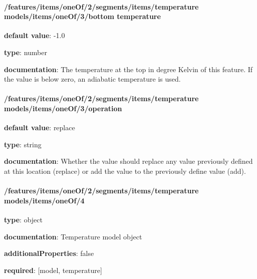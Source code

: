 \begin{itemized}
\end{itemized}\paragraph{/features/items/oneOf/2/segments/items/temperature models/items/oneOf/3/bottom temperature} \begin{itemized}
\item {\bf default value}: -1.0
\item {\bf type}: number
\item {\bf documentation}: The temperature at the top in degree Kelvin of this feature. If the value is below zero, an adiabatic temperature is used.
\end{itemized}\paragraph{/features/items/oneOf/2/segments/items/temperature models/items/oneOf/3/operation} \begin{itemized}
\item {\bf default value}: replace
\item {\bf type}: string
\item {\bf documentation}: Whether the value should replace any value previously defined at this location (replace) or add the value to the previously define value (add).
\end{itemized}\paragraph{/features/items/oneOf/2/segments/items/temperature models/items/oneOf/4} \begin{itemized}
\item {\bf type}: object
\item {\bf documentation}: Temperature model object
\item {\bf additionalProperties}: false
\item {\bf required}: [model, temperature]\end{itemized}
